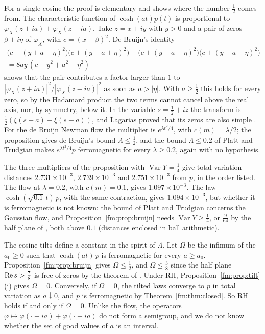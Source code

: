 For a single cosine the proof is elementary and shows where the number $\frac12$ comes from. The characteristic function of $\cosh(at)p(t)$ is proportional to $\varphi_X(z+ia)+\varphi_X(z-ia)$. Take $z=x+iy$ with $y>0$ and a pair of zeros $\beta\pm i\eta$ of $\varphi_X$, with $c=(x-\beta)^2$. De Bruijn's identity \cite[Lemma~1]{deBruijn}
\begin{multline*}
\big(c+(y+a-\eta)^2\big)\big(c+(y+a+\eta)^2\big)-\big(c+(y-a-\eta)^2\big)\big(c+(y-a+\eta)^2\big)\\
=8ay\,(c+y^2+a^2-\eta^2)
\end{multline*}
shows that the pair contributes a factor larger than $1$ to $|\varphi_X(z+ia)|^2/|\varphi_X(z-ia)|^2$ as soon as $a>|\eta|$. With $a\ge\frac12$ this holds for every zero, so by the Hadamard product the two terms cannot cancel above the real axis, nor, by symmetry, below it. In the variable $s=\frac12+iz$ the transform is $\frac12(\xi(s+a)+\xi(s-a))$, and Lagarias proved that its zeros are also simple \cite{Lagarias05}. For the de Bruijn Newman flow the multiplier is $e^{\lambda t^2/4}$, with $c(m)=\lambda/2$; the proposition gives de Bruijn's bound $\Lambda\le\frac12$, and the bound $\Lambda\le0.2$ of Platt and Trudgian \cite{PT21} makes $e^{\lambda t^2/4}p$ ferromagnetic for every $\lambda\ge0.2$, again with no hypothesis.

The three multipliers of the proposition with $\operatorname{Var}Y=\frac14$ give total variation distances $2.731\times10^{-3}$, $2.739\times10^{-3}$ and $2.751\times10^{-3}$ from $p$, in the order listed. The flow at $\lambda=0.2$, with $c(m)=0.1$, gives $1.097\times10^{-3}$. The law $\cosh(\sqrt{0.1}\,t)\,p$, with the same contraction, gives $1.094\times10^{-3}$, but whether it is ferromagnetic is not known: the bound of Platt and Trudgian concerns the Gaussian flow, and Proposition~\ref{fm:prop:bruijn} needs $\operatorname{Var}Y\ge\frac14$, or $\frac9{64}$ by the half plane of \cite{OAI26a}, both above $0.1$ (distances enclosed in ball arithmetic).

The cosine tilts define a constant in the spirit of $\Lambda$. Let $\Omega$ be the infimum of the $a_0\ge0$ such that $\cosh(at)\,p$ is ferromagnetic for every $a\ge a_0$. Proposition~\ref{fm:prop:bruijn} gives $\Omega\le\frac12$, and $\Omega\le\frac38$ since the half plane $\operatorname{Re} s>\frac78$ is free of zeros by the theorem of \cite{OAI26a}. Under RH, Proposition~\ref{fm:prop:tilt}(i) gives $\Omega=0$. Conversely, if $\Omega=0$, the tilted laws converge to $p$ in total variation as $a\downarrow0$, and $p$ is ferromagnetic by Theorem~\ref{fm:thm:closed}. So RH holds if and only if $\Omega=0$. Unlike the flow, the operators $\varphi\mapsto\varphi(\cdot+ia)+\varphi(\cdot-ia)$ do not form a semigroup, and we do not know whether the set of good values of $a$ is an interval.

